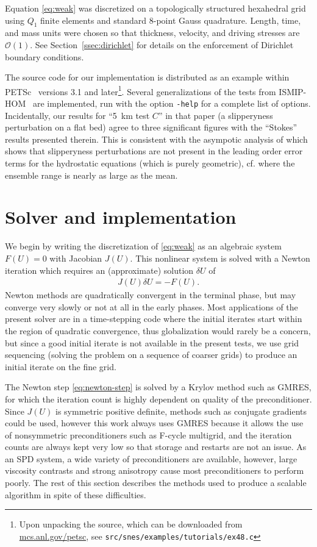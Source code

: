 \documentclass[3p]{elsarticle}
\newcommand{\bigO}{{\mathcal{O}}}
\begin{document}
Equation \eqref{eq:weak} was discretized on a topologically structured hexahedral grid using $Q_1$ finite elements and standard 8-point Gauss quadrature.  Length, time, and mass units were chosen so that thickness, velocity, and driving stresses are $\bigO(1)$.  See Section~\ref{ssec:dirichlet} for details on the enforcement of Dirichlet boundary conditions.

The source code for our implementation is distributed as an example within PETSc~\cite{petsc-web-page} versions 3.1 and later\footnote{Upon unpacking the source, which can be downloaded from \href{http://mcs.anl.gov/petsc}{mcs.anl.gov/petsc}, see \texttt{src/snes/examples/tutorials/ex48.c}}.  Several generalizations of the tests from ISMIP-HOM~\cite{pattyn2008beh} are implemented, run with the option \texttt{-help} for a complete list of options.  Incidentally, our results for ``\SI{5}{\kilo\metre} test $C$'' in that paper (a slipperyness perturbation on a flat bed) agree to three significant figures with the ``Stokes'' results presented therein.  This is consistent with the asympotic analysis of \cite{schoof2010thin} which shows that slipperyness perturbations are not present in the leading order error terms for the hydrostatic equations (which is purely geometric), cf. \cite[Table~4,Figure~8]{pattyn2008beh} where the ensemble range is nearly as large as the mean.

\section{Solver and implementation}\label{sec:solver}
We begin by writing the discretization of \eqref{eq:weak} as an algebraic system $F(U) = 0$ with
Jacobian $J(U)$.  This nonlinear system is solved with a Newton iteration which requires an
(approximate) solution $\delta U$ of
\begin{align}\label{eq:newton-step}
  J(U)\delta U = -F(U) .
\end{align}
Newton methods are quadratically convergent in the terminal phase, but may converge very slowly or
not at all in the early phases.  Most applications of the present solver are in a time-stepping code
where the initial iterates start within the region of quadratic convergence, thus globalization
would rarely be a concern, but since a good initial iterate is not available in the present tests,
we use grid sequencing (solving the problem on a sequence of coarser grids) to produce an initial
iterate on the fine grid.

The Newton step \eqref{eq:newton-step} is solved by a Krylov method such as GMRES, for which the iteration count is highly dependent on quality of the preconditioner.  Since $J(U)$ is symmetric positive definite, methods such as conjugate gradients could be used, however this work always uses GMRES because it allows the use of nonsymmetric preconditioners such as F-cycle multigrid, and the iteration counts are always kept very low so that storage and restarts are not an issue.  As an SPD system, a wide variety of preconditioners are available, however, large viscosity contrasts and strong anisotropy cause most preconditioners to perform poorly. The rest of this section describes the methods used to produce a scalable algorithm in spite of these difficulties.
\end{document}
